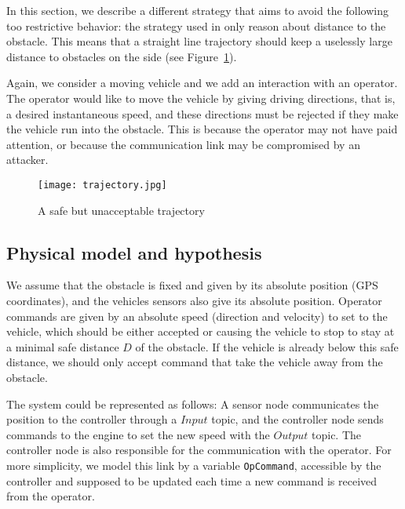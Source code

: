 In this section, we describe a different strategy that aims to avoid the following too restrictive behavior: the strategy used in \cite{Mitsch-RSS-13} only reason about distance to the obstacle. This means that a straight line trajectory should keep a uselessly large distance to obstacles on the side (see Figure~\ref{OA}).

Again, we consider a moving vehicle and we add an interaction with an operator. The operator would like to move the vehicle by giving driving directions, that is, a desired instantaneous speed, and these directions must be rejected if they make the vehicle run into the obstacle.
This is because the operator may not have paid attention, or because the communication link may be compromised by an attacker.

\begin{figure}[ht]
\begin{center}
\texttt{[image: trajectory.jpg]}
\caption{A safe but unacceptable trajectory}\label{OA}
\end{center}
\end{figure}

\subsection{Physical model and hypothesis}

We assume that the obstacle is fixed and given by its absolute position (GPS coordinates), and the vehicles sensors also give its absolute position.
Operator commands are given by an absolute speed (direction and velocity) to set to the vehicle, which should be either accepted or causing the vehicle to stop to stay at a minimal safe distance $D$ of the obstacle.
If the vehicle is already below this safe distance, we should only accept command that take the vehicle away from the obstacle.

The system could be represented as follows: A sensor node communicates the position to the controller through a $\mathit{Input}$ topic, and the controller node sends commands to the engine to set the new speed with the $Output$ topic. 
The controller node is also responsible for the communication with the operator. %
For more simplicity, we model this link by a variable \texttt{OpCommand}, accessible by the controller and supposed to be updated each time a new command is received from the operator.


